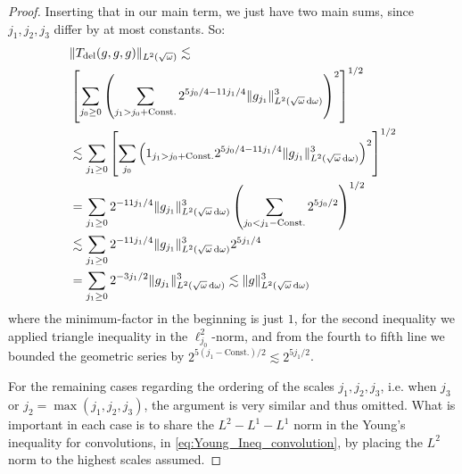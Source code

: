 \documentclass[reqno,11pt,letterpaper]{amsart}
\numberwithin{equation}{section}
\newcommand{\dd}{\, {\rm d}}
\begin{document}
\begin{proof}
        Inserting that in our main term, we just have two main sums, since $j_1,j_2,j_3$ differ by at most constants. So:
        \begin{equation}
    \begin{split}
      &\|T_{\text{del}}(g,g,g)\|_{L^2(\sqrt{\omega})} 
        \lesssim \\ & 
        \left[ \sum_{j_0\geq 0}
                       \left( \sum_{j_1> j_0 + \text{Const.}}   
                        2^{5 j_0/4 - 11 j_1/4}
            \|g_{j_1}\|_{L^2(\sqrt{\omega}\dd\omega)}^3
                 \right)^2 \right]^{1/2} \\
                 & \lesssim 
                 \sum_{j_1\geq 0} 
                 \left[ \sum_{j_0} \left(1_{j_1>j_0+\text{Const.}} 2^{5 j_0/4 - 11 j_1/4}\|g_{j_1}\|_{L^2(\sqrt{\omega}\dd\omega)}^3\right)^2
                 \right]^{1/2}\\
                 & = 
                 \sum_{j_1\geq 0} 2^{- 11 j_1/4} \|g_{j_1}\|_{L^2(\sqrt{\omega}\dd\omega)}^3 
                 \left( \sum_{j_0< j_1 - \text{Const.}} 2^{5 j_0/2}  \right)^{1/2}\\
                 & \lesssim \sum_{j_1\geq 0} 2^{- 11 j_1/4} \|g_{j_1}\|_{L^2(\sqrt{\omega}\dd\omega)}^3 2^{5j_1/4}
                 \\
                 & = 
                 \sum_{j_1\geq 0} 2^{- 3 j_1/2} \|g_{j_1}\|_{L^2(\sqrt{\omega}\dd\omega)}^3  \lesssim \|g\|_{L^2(\sqrt{\omega}\dd\omega)}^3 
        \end{split}
        \end{equation}
        where the minimum-factor in the beginning is just $1$, for the second inequality we applied triangle inequality in the $\ell^2_{j_0}$-norm, and from the fourth to fifth line we bounded the geometric series by $2^{5(j_1 -\text{Const.})/2}\lesssim 2^{5 j_1/2}$.
        
For the remaining cases regarding the ordering of the scales $j_1, j_2, j_3$, i.e. when $j_3$ or $j_2 = \max(j_1,j_2, j_3)$, the argument is very similar and thus omitted. What is important in each case is to share the $L^2-L^1-L^1$ norm in the Young's inequality for convolutions, in \eqref{eq:Young_Ineq_convolution},  by placing the $L^2$ norm to the highest scales assumed. 


\end{proof}
\end{document}
